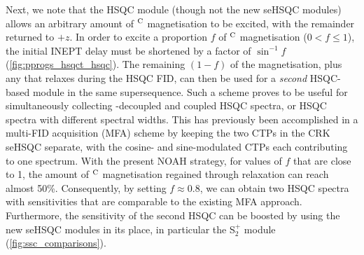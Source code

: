 \documentclass[11pt]{article}
\newcommand*{\noahSpb}{S$^+_2$}
\newcommand*{\carbon}{\ce{^{13}C}}
\newcommand*{\magn}[1]{\ce{^1H}$^{#1}$}
\begin{document}
Next, we note that the HSQC module (though not the new seHSQC modules) allows an arbitrary amount of \magn{\ce{C}} magnetisation to be excited, with the remainder returned to $+z$.
In order to excite a proportion $f$ of \magn{\ce{C}} magnetisation ($0 < f \leq 1$), the initial INEPT delay must be shortened by a factor of $\sin^{-1}f$ (\cref{fig:pprogs_hsqct_hsqc}).
The remaining $(1 - f)$ of the magnetisation, plus any that relaxes during the HSQC FID, can then be used for a \textit{second} HSQC-based module in the same supersequence.
Such a scheme proves to be useful for simultaneously collecting \carbon{}-decoupled and coupled HSQC spectra, or HSQC spectra with different spectral widths.
This has previously been accomplished in a multi-FID acquisition (MFA) scheme by keeping the two CTPs in the CRK seHSQC separate, with the cosine- and sine-modulated CTPs each contributing to one spectrum.\autocite{ctphsqc}
With the present NOAH strategy, for values of $f$ that are close to 1, the amount of \magn{\ce{C}} magnetisation regained through relaxation can reach almost 50\%.
Consequently, by setting $f \approx 0.8$, we can obtain two HSQC spectra with sensitivities that are comparable to the existing MFA approach.
Furthermore, the sensitivity of the second HSQC can be boosted by using the new seHSQC modules in its place, in particular the \noahSpb{} module (\cref{fig:ssc_comparisons}).
\end{document}
